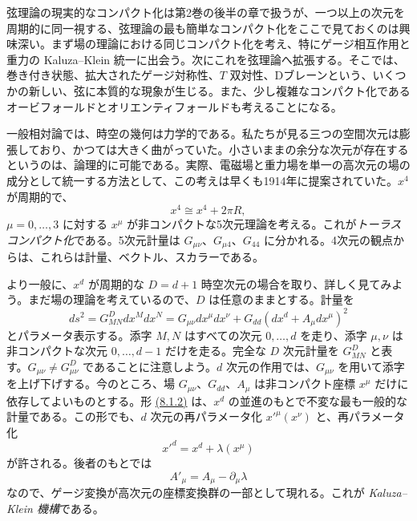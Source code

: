 \label{ch:8}

弦理論の現実的なコンパクト化は第2巻の後半の章で扱うが、一つ以上の次元を周期的に同一視する、弦理論の最も簡単なコンパクト化をここで見ておくのは興味深い。まず場の理論における同じコンパクト化を考え、特にゲージ相互作用と重力の Kaluza--Klein 統一に出会う。次にこれを弦理論へ拡張する。そこでは、巻き付き状態、拡大されたゲージ対称性、$T$ 双対性、Dブレーンという、いくつかの新しい、弦に本質的な現象が生じる。また、少し複雑なコンパクト化であるオービフォールドとオリエンティフォールドも考えることになる。

\label{sec:8.1}

一般相対論では、時空の幾何は力学的である。私たちが見る三つの空間次元は膨張しており、かつては大きく曲がっていた。小さいままの余分な次元が存在するというのは、論理的に可能である。実際、電磁場と重力場を単一の高次元の場の成分として統一する方法として、この考えは早くも1914年に提案されていた。$x^4$ が周期的で、
\begin{equation}
x^4\cong x^4+2\pi R,
\tag{8.1.1}\label{eq:8.1.1}
\end{equation}
$\mu=0,\ldots,3$ に対する $x^\mu$ が非コンパクトな5次元理論を考える。これが\emph{トーラスコンパクト化}である。5次元計量は $G_{\mu\nu}$、$G_{\mu4}$、$G_{44}$ に分かれる。4次元の観点からは、これらは計量、ベクトル、スカラーである。

より一般に、$x^d$ が周期的な $D=d+1$ 時空次元の場合を取り、詳しく見てみよう。まだ場の理論を考えているので、$D$ は任意のままとする。計量を
\begin{equation}
ds^2=G^D_{MN}dx^Mdx^N=G_{\mu\nu}dx^\mu dx^\nu
+G_{dd}(dx^d+A_\mu dx^\mu)^2
\tag{8.1.2}\label{eq:8.1.2}
\end{equation}
とパラメータ表示する。添字 $M,N$ はすべての次元 $0,\ldots,d$ を走り、添字 $\mu,\nu$ は非コンパクトな次元 $0,\ldots,d-1$ だけを走る。完全な $D$ 次元計量を $G^D_{MN}$ と表す。$G_{\mu\nu}\ne G^D_{\mu\nu}$ であることに注意しよう。$d$ 次元の作用では、$G_{\mu\nu}$ を用いて添字を上げ下げする。今のところ、場 $G_{\mu\nu}$、$G_{dd}$、$A_\mu$ は非コンパクト座標 $x^\mu$ だけに依存してよいものとする。形 \hyperref[eq:8.1.2]{(8.1.2)} は、$x^d$ の並進のもとで不変な最も一般的な計量である。この形でも、$d$ 次元の再パラメータ化 $x'^\mu(x^\nu)$ と、再パラメータ化
\begin{equation}
x'^d=x^d+\lambda(x^\mu)
\tag{8.1.3}\label{eq:8.1.3}
\end{equation}
が許される。後者のもとでは
\begin{equation}
A'_\mu=A_\mu-\partial_\mu\lambda
\tag{8.1.4}\label{eq:8.1.4}
\end{equation}
なので、ゲージ変換が高次元の座標変換群の一部として現れる。これが \emph{Kaluza--Klein 機構}である。

